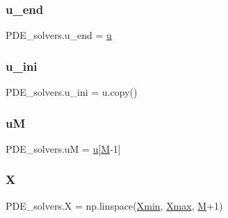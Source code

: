 \subsubsection{\texorpdfstring{u\+\_\+end}{u\_end}}
{\footnotesize\ttfamily P\+D\+E\+\_\+solvers.\+u\+\_\+end = \hyperlink{namespacePDE__solvers_abaa9fdf113a88661fc0afa93032755d3}{u}}

\mbox{\label{namespacePDE__solvers_a2184f2624ab571a00cfedb3a2a45cfaf}} 
\subsubsection{\texorpdfstring{u\+\_\+ini}{u\_ini}}
{\footnotesize\ttfamily P\+D\+E\+\_\+solvers.\+u\+\_\+ini = u.\+copy()}

\mbox{\label{namespacePDE__solvers_acd452357e85c033220a4da5bc3f71966}} 
\subsubsection{\texorpdfstring{uM}{uM}}
{\footnotesize\ttfamily P\+D\+E\+\_\+solvers.\+uM = \hyperlink{namespacePDE__solvers_abaa9fdf113a88661fc0afa93032755d3}{u}\mbox{[}\hyperlink{namespacePDE__solvers_a9d6fca7c2abdff4c2c7feec55d437940}{M}-\/1\mbox{]}}

\mbox{\label{namespacePDE__solvers_ab53183fc05bd900f7013cd056e2e7338}} 
\subsubsection{\texorpdfstring{X}{X}}
{\footnotesize\ttfamily P\+D\+E\+\_\+solvers.\+X = np.\+linspace(\hyperlink{namespacePDE__solvers_a7a1ac835675841b757a70f18b51246dc}{Xmin}, \hyperlink{namespacePDE__solvers_a48fb209db97ce5937802d0a747fb9991}{Xmax}, \hyperlink{namespacePDE__solvers_a9d6fca7c2abdff4c2c7feec55d437940}{M}+1)}

\mbox{\label{namespacePDE__solvers_a48fb209db97ce5937802d0a747fb9991}} 
